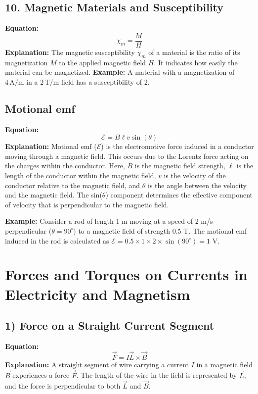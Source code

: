 \documentclass{article}
\begin{document}
\subsection*{10. Magnetic Materials and Susceptibility}
\textbf{Equation:} 
\[ \chi_m = \frac{M}{H} \]
\textbf{Explanation:} 
The magnetic susceptibility \( \chi_m \) of a material is the ratio of its magnetization \( M \) to the applied magnetic field \( H \). It indicates how easily the material can be magnetized.
\textbf{Example:}
A material with a magnetization of \( 4 \, \text{A/m} \) in a \( 2 \, \text{T/m} \) field has a susceptibility of 2.

\subsection*{Motional emf}
\textbf{Equation:} 
\[ \mathcal{E} = B \ell v \sin(\theta) \]
\textbf{Explanation:} 
Motional emf (\( \mathcal{E} \)) is the electromotive force induced in a conductor moving through a magnetic field. This occurs due to the Lorentz force acting on the charges within the conductor. Here, \( B \) is the magnetic field strength, \( \ell \) is the length of the conductor within the magnetic field, \( v \) is the velocity of the conductor relative to the magnetic field, and \( \theta \) is the angle between the velocity and the magnetic field. The sin(\( \theta \)) component determines the effective component of velocity that is perpendicular to the magnetic field.

\textbf{Example:}
Consider a rod of length 1 m moving at a speed of 2 m/s perpendicular (\( \theta = 90^\circ \)) to a magnetic field of strength 0.5 T. The motional emf induced in the rod is calculated as \( \mathcal{E} = 0.5 \times 1 \times 2 \times \sin(90^\circ) = 1 \) V.

\section*{Forces and Torques on Currents in Electricity and Magnetism}

\subsection*{1) Force on a Straight Current Segment}
\textbf{Equation:} 
\[ \vec{F} = I\vec{L} \times \vec{B} \]
\textbf{Explanation:} 
A straight segment of wire carrying a current \( I \) in a magnetic field \( \vec{B} \) experiences a force \( \vec{F} \). The length of the wire in the field is represented by \( \vec{L} \), and the force is perpendicular to both \( \vec{L} \) and \( \vec{B} \).
\end{document}

